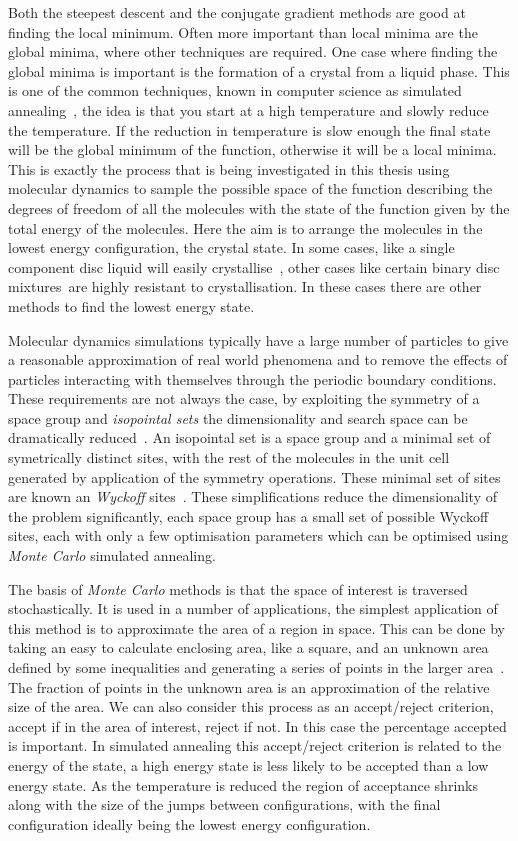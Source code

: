 Both the steepest descent and the conjugate gradient methods are good at finding the local minimum. Often more important than local minima are the global minima, where other techniques are required. One case where finding the global minima is important is the formation of a crystal from a liquid phase. This is one of the common techniques, known in computer science as simulated annealing~\tocite, the idea is that you start at a high temperature and slowly reduce the temperature. If the reduction in temperature is slow enough the final state will be the global minimum of the function, otherwise it will be a local minima. This is exactly the process that is being investigated in this thesis using molecular dynamics to sample the possible space of the function describing the degrees of freedom of all the molecules with the state of the function given by the total energy of the molecules. Here the aim is to arrange the molecules in the lowest energy configuration, the crystal state. In some cases, like a single component disc liquid will easily crystallise~\tocite, other cases like certain binary disc mixtures~\tocite are highly resistant to crystallisation. In these cases there are other methods to find the lowest energy state.

Molecular dynamics simulations typically have a large number of particles to give a reasonable approximation of real world phenomena and to remove the effects of particles interacting with themselves through the periodic boundary conditions. These requirements are not always the case, by exploiting the symmetry of a space group and \emph{isopointal sets} the dimensionality and search space can be dramatically reduced~\cite{hudson:10}. An isopointal set is a space group and a minimal set of symetrically distinct sites, with the rest of the molecules in the unit cell generated by application of the symmetry operations. These minimal set of sites are known an \emph{Wyckoff} sites~\cite{gelato:87,bergerhoff:99}. These simplifications reduce the dimensionality of the problem significantly, each space group has a small set of possible Wyckoff sites, each with only a few optimisation parameters which can be optimised using \emph{Monte Carlo} simulated annealing.

The basis of \emph{Monte Carlo} methods is that the space of interest is traversed stochastically. It is used in a number of applications, the simplest application of this method is to approximate the area of a region in space. This can be done by taking an easy to calculate enclosing area, like a square, and an unknown area defined by some inequalities and generating a series of points in the larger area~. The fraction of points in the unknown area is an approximation of the relative size of the area. We can also consider this process as an accept/reject criterion, accept if in the area of interest, reject if not. In this case the percentage accepted is important. In simulated annealing this accept/reject criterion is related to the energy of the state, a high energy state is less likely to be accepted than a low energy state. As the temperature is reduced the region of acceptance shrinks along with the size of the jumps between configurations, with the final configuration ideally being the lowest energy configuration.

